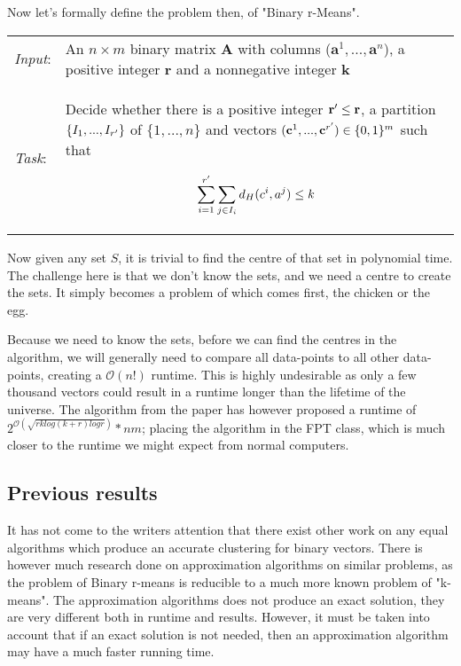 \documentclass[a4paper]{article}
\begin{document}
Now let's formally define the problem then, of "Binary r-Means".
\begin{problem}
\begin{tabular}{p{}p{}}
    \textit{Input}: & An $n \times m$ binary matrix \textbf{A} with columns
    ($\textbf{a}^1,...,\textbf{a}^n$), a positive integer $\textbf{r}$ and a nonnegative
    integer $\textbf{k}$                                                                     \\

    \textit{Task}:  & Decide whether there is a positive integer $\textbf{r}\sp{\prime} \leq
        \textbf{r}$, a partition $\{I_1, ..., I_{r\sp{\prime}}\}$ of $\{1,...,n\}$ and vectors
    $(\textbf{c}^1,...,\textbf{c}^{r\sp{\prime}}) \in \{0,1\}^m$ such that

    \[
        \sum_{i = 1}^{r\sp{\prime}} \sum_{j \in I_i} d_H(c^i, a^j) \leq k
    \]
\end{tabular}
\end{problem}

Now given any set $S$, it is trivial to find the centre of that set in polynomial time. The challenge
here is that we don't know the sets, and we need a centre to create the sets. It simply becomes a problem
of which comes first, the chicken or the egg.

Because we need to know the sets, before we can find the centres in the algorithm, we will
generally need to compare all data-points to all other data-points, creating a $\mathcal{O}(n!)$ runtime. This
is highly undesirable as only a few thousand vectors could result in a runtime longer than the lifetime
of the universe. The algorithm from the paper \cite{fomin_golovach_panolan_2020} has however proposed a
runtime of $2^{\mathcal{O} (\sqrt{rk log(k+r) logr})}*nm$; placing the algorithm in the FPT class, which is
much closer to the runtime we might expect from normal computers.

\subsection{Previous results}
It has not come to the writers attention that there exist other work on any equal algorithms which produce an
accurate clustering for binary vectors. There is however much research done on approximation algorithms on similar
problems, as the problem of Binary r-means is reducible to a much more known problem of "k-means".
The approximation algorithms does not produce an exact solution, they are very different both in runtime
and results. However, it must be taken into account that if an exact solution is not needed, then an approximation
algorithm may have a much faster running time.
\cite{SimonovKirill2021ACoC,DanChen2015LRAo,zohar:k-means-viability,ibm:support:k-means:opinion}
\end{document}
